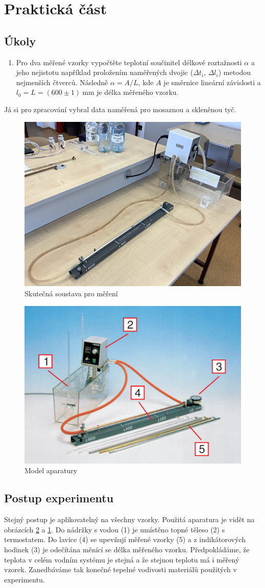 \documentclass[a4paper,12pt]{article}   %
\begin{document}
\newpage

\section{Praktická část}

\subsection{Úkoly}
\label{ch:ukoly}
\begin{enumerate}
  \item Pro dva měřené vzorky vypočtěte teplotní součinitel délkové roztažnosti $\alpha$ a jeho nejistotu například proložením naměřených dvojic ($\Delta t_i$, $\Delta l_i$) metodou nejmenších čtverců. Následně $\alpha = A/L$, kde $A$ je směrnice lineární závislosti a $l_0 = L = (600 \pm 1)~\text{mm}$ je délka měřeného vzorku.
\end{enumerate}
Já si pro zpracování vybral data naměřená pro mosaznou a skleněnou tyč.

\begin{figure}[htbp]
  \centering
  \includegraphics[width=.4\textwidth]{schema.png}
  \caption{Skutečná soustava pro měření}
  \label{fig:aparatura}
\end{figure}
\begin{figure}[htbp]
  \centering
  \includegraphics[width=.4\textwidth]{schema-cisla.png}
  \caption{Model aparatury}
  \label{obr:soustava}
\end{figure}

\subsection{Postup experimentu}
Stejný postup je aplikovatelný na všechny vzorky. Použitá aparatura je vidět na obrázcích \ref{obr:soustava} a \ref{fig:aparatura}.
Do nádržky s vodou (1) je umístěno topné těleso (2) s termostatem. Do lavice (4) se upevňují měřené vzorky (5) a z indikátorových hodinek (3) je odečítána měnící se délka měřeného vzorku. Předpokládáme, že teplota v celém vodním systému je stejná a že stejnou teplotu má i měřený vzorek. Zanedbáváme tak konečné tepelné vodivosti materiálů použitých v experimentu. 
\end{document}
